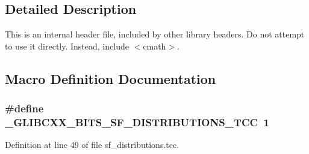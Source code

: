 \subsection{Detailed Description}
This is an internal header file, included by other library headers. Do not attempt to use it directly. Instead, include $<$cmath$>$. 

\subsection{Macro Definition Documentation}
\subsubsection[{\texorpdfstring{\+\_\+\+G\+L\+I\+B\+C\+X\+X\+\_\+\+B\+I\+T\+S\+\_\+\+S\+F\+\_\+\+D\+I\+S\+T\+R\+I\+B\+U\+T\+I\+O\+N\+S\+\_\+\+T\+CC}{_GLIBCXX_BITS_SF_DISTRIBUTIONS_TCC}}]{\setlength{\rightskip}{0pt plus 5cm}\#define \+\_\+\+G\+L\+I\+B\+C\+X\+X\+\_\+\+B\+I\+T\+S\+\_\+\+S\+F\+\_\+\+D\+I\+S\+T\+R\+I\+B\+U\+T\+I\+O\+N\+S\+\_\+\+T\+CC~1}\hypertarget{sf__distributions_8tcc_a3af0d272d6bbb6104b89109f772d6092}{}\label{sf__distributions_8tcc_a3af0d272d6bbb6104b89109f772d6092}


Definition at line 49 of file sf\+\_\+distributions.\+tcc.

